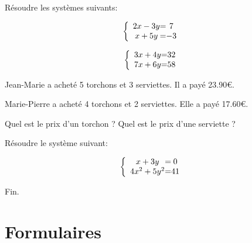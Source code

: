 \documentclass[a4paper,12pt]{scrartcl}
\begin{document}
Résoudre les systèmes suivants:

\question{} 

\[
\left \{
\begin{array}{c @{=} c}
    2x - 3y & 7 \\
    x  + 5y & -3 \\
\end{array}
\right.
\]

\lignes{\midlines}

\question{} 

\[
\left \{
\begin{array}{c @{=} c}
    3x + 4y & 32 \\
    7x + 6y & 58 \\
\end{array}
\right.
\]

\lignes{\midlines}

\question{} 

Jean-Marie a acheté 5 torchons et 3 serviettes. Il a payé 23.90€.

Marie-Pierre a acheté 4 torchons et 2 serviettes. Elle a payé 17.60€.

Quel est le prix d'un torchon ? Quel est le prix d'une serviette ?

\lignes{\manylines}


Résoudre le système suivant:

\[
\left \{
\begin{array}{c @{=} c}
    x + 3y & 0 \\
    4x^2 + 5y^2 & 41 \\
\end{array}
\right.
\]

\lignes{\manylines}

\begin{center}
Fin.
\end{center}

\section*{Formulaires}





\trait
\end{document}
